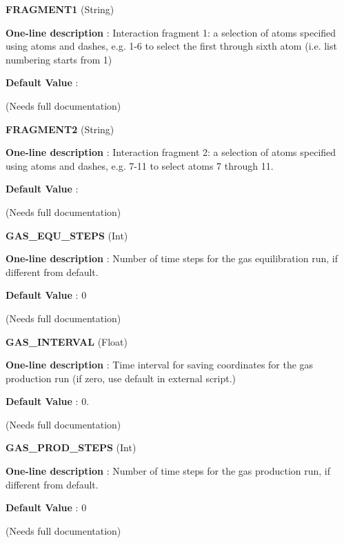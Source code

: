 \begin{DoxyItemize}
\item {\bfseries  \-F\-R\-A\-G\-M\-E\-N\-T1 } (\-String) \par
{\bfseries  \-One-\/line description }\-: \-Interaction fragment 1\-: a selection of atoms specified using atoms and dashes, e.\-g. 1-\/6 to select the first through sixth atom (i.\-e. list numbering starts from 1) \par
{\bfseries  \-Default \-Value }\-: \par
(\-Needs full documentation)\end{DoxyItemize}
\begin{DoxyItemize}
\item {\bfseries  \-F\-R\-A\-G\-M\-E\-N\-T2 } (\-String) \par
{\bfseries  \-One-\/line description }\-: \-Interaction fragment 2\-: a selection of atoms specified using atoms and dashes, e.\-g. 7-\/11 to select atoms 7 through 11. \par
{\bfseries  \-Default \-Value }\-: \par
(\-Needs full documentation)\end{DoxyItemize}
\begin{DoxyItemize}
\item {\bfseries  \-G\-A\-S\-\_\-\-E\-Q\-U\-\_\-\-S\-T\-E\-P\-S } (\-Int) \par
{\bfseries  \-One-\/line description }\-: \-Number of time steps for the gas equilibration run, if different from default. \par
{\bfseries  \-Default \-Value }\-: 0 \par
(\-Needs full documentation)\end{DoxyItemize}
\begin{DoxyItemize}
\item {\bfseries  \-G\-A\-S\-\_\-\-I\-N\-T\-E\-R\-V\-A\-L } (\-Float) \par
{\bfseries  \-One-\/line description }\-: \-Time interval for saving coordinates for the gas production run (if zero, use default in external script.) \par
{\bfseries  \-Default \-Value }\-: 0. \par
(\-Needs full documentation)\end{DoxyItemize}
\begin{DoxyItemize}
\item {\bfseries  \-G\-A\-S\-\_\-\-P\-R\-O\-D\-\_\-\-S\-T\-E\-P\-S } (\-Int) \par
{\bfseries  \-One-\/line description }\-: \-Number of time steps for the gas production run, if different from default. \par
{\bfseries  \-Default \-Value }\-: 0 \par
(\-Needs full documentation)\end{DoxyItemize}
